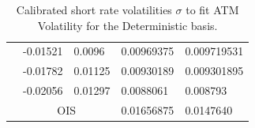 \documentclass[12pt]{article}
\begin{document}
\begin{table}[H]
\begin{tabular}{|c||c||c||c|c|}
                        & \multicolumn{1}{l||}{-0.01521} & \multicolumn{1}{l||}{0.0096} & \multicolumn{1}{l|}{0.00969375} & \multicolumn{1}{l|}{0.009719531} \\\cline{2-5}
                        & \multicolumn{1}{l||}{-0.01782} & \multicolumn{1}{l||}{0.01125} & \multicolumn{1}{l|}{0.00930189} & \multicolumn{1}{l|}{0.009301895} \\\cline{2-5}
                        & \multicolumn{1}{l||}{-0.02056} & \multicolumn{1}{l||}{0.01297} & \multicolumn{1}{l|}{0.0088061} & \multicolumn{1}{l|}{0.008793} \\\hline
                        &  \multicolumn{2}{|c||}{OIS}                          &  \multicolumn{1}{l|}{0.01656875} & \multicolumn{1}{l|}{0.0147640} \\ \hline
     \end{tabular}
    \caption{Calibrated short rate volatilities $\sigma$ to fit ATM Volatility for the Deterministic basis.}
    \label{tab:CalShortVol}
\end{table}
\end{document}
